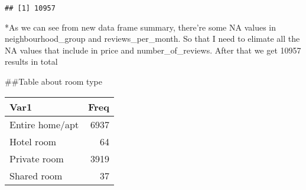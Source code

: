 \documentclass[
]{article}
\newenvironment{Shaded}{\begin{snugshade}}{\end{snugshade}}
\newcommand{\CommentTok}[1]{\textcolor[rgb]{0.56,0.35,0.01}{\textit{#1}}}
\newcommand{\DecValTok}[1]{\textcolor[rgb]{0.00,0.00,0.81}{#1}}
\newcommand{\FunctionTok}[1]{\textcolor[rgb]{0.00,0.00,0.00}{#1}}
\newcommand{\NormalTok}[1]{#1}
\newcommand{\OtherTok}[1]{\textcolor[rgb]{0.56,0.35,0.01}{#1}}
\newcommand{\SpecialCharTok}[1]{\textcolor[rgb]{0.00,0.00,0.00}{#1}}
\begin{document}
\begin{Shaded}
\end{Shaded}

\begin{verbatim}
## [1] 10957
\end{verbatim}

*As we can see from new data frame summary, there're some NA values in
neighbourhood\_group and reviews\_per\_month. So that I need to elimate
all the NA values that include in price and number\_of\_reviews. After
that we get 10957 results in total

\#\#Table about room type

\begin{Shaded}
\end{Shaded}

\begin{tabular}{l|r}
\hline
Var1 & Freq\\
\hline
Entire home/apt & 6937\\
\hline
Hotel room & 64\\
\hline
Private room & 3919\\
\hline
Shared room & 37\\
\hline
\end{tabular}
\end{document}
